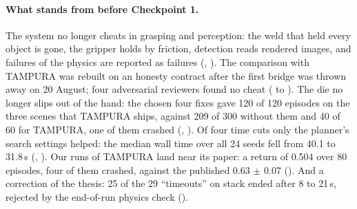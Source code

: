 \paragraph{What stands from before Checkpoint 1.}
The system no longer cheats in grasping and perception: the weld that held every object is gone, the gripper
holds by friction, detection reads rendered images, and failures of the physics are reported as failures
(, ). The comparison with TAMPURA was rebuilt on an honesty contract after the first bridge was
thrown away on 20 August; four adversarial reviewers found no cheat ( to ). The die no longer slips
out of the hand: the chosen four fixes gave 120 of 120 episodes on the three scenes that TAMPURA ships, against
209 of 300 without them and 40 of 60 for TAMPURA, one of them crashed (, ). Of
four time cuts only the planner's search settings helped: the median wall time over all 24 seeds fell from 40.1
to 31.8\,s (, ). Our runs of TAMPURA land near its paper: a return of 0.504 over 80 episodes, four of them
crashed, against the published 0.63 $\pm$ 0.07 (). And a correction of the
thesis: 25 of the 29 ``timeouts'' on stack ended after 8 to 21\,s, rejected by the end-of-run physics check
(). 

